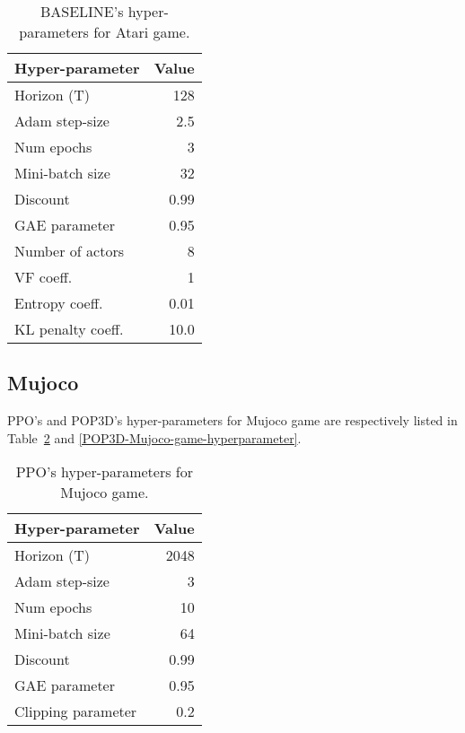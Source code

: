 \documentclass{article}
\begin{document}
\begin{table}[ht]
	\begin{center}
		\begin{tabular}{lr}
			\toprule
			Hyper-parameter & Value \\
			\midrule
			Horizon (T)    &128 \\
			Adam step-size &2.5 \\
			Num epochs    & 3 \\
			Mini-batch size    & 32\\
			Discount      & 0.99\\
			GAE parameter       & 0.95 \\
			Number of actors      & 8\\
			VF coeff. &1 \\
			Entropy coeff. &0.01 \\
			KL penalty coeff. &10.0 \\
			\bottomrule
		\end{tabular}
	\end{center}
	\caption{BASELINE's hyper-parameters for Atari game.}
	\label{Baseline-Atari-game-hyperparameter}
\end{table}	

\subsection{Mujoco}\label{hyper-mujoco}


PPO's and  POP3D's hyper-parameters for Mujoco game are respectively listed in Table~\ref{PPO-Mujoco-game-hyperparameter} and \ref{POP3D-Mujoco-game-hyperparameter}.
\begin{table}
	\begin{center}
		\begin{tabular}{lr}
			\toprule
			Hyper-parameter & Value \\
			\midrule
			Horizon (T)    &2048 \\
			Adam step-size &3 \\
			Num epochs    & 10 \\
			Mini-batch size    & 64\\
			Discount      & 0.99\\
			GAE parameter       & 0.95 \\
			Clipping parameter &0.2 \\
			\bottomrule
		\end{tabular}
		\caption{PPO's hyper-parameters for Mujoco game.}
		\label{PPO-Mujoco-game-hyperparameter}
	\end{center}
\end{table}
\end{document}
